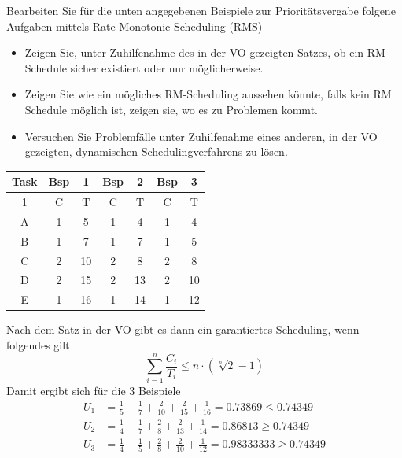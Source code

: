 \documentclass[12pt,a4paper,ngerman]{article}
\begin{document}
\begin{framed}
Bearbeiten Sie für die unten angegebenen Beispiele zur Prioritätsvergabe folgene Aufgaben mittels Rate-Monotonic Scheduling (RMS)
\begin{itemize}
\item Zeigen Sie, unter Zuhilfenahme des in der VO gezeigten Satzes, ob ein RM-Schedule sicher existiert oder nur möglicherweise.
\item Zeigen Sie wie ein mögliches RM-Scheduling aussehen könnte, falls kein RM Schedule möglich ist, zeigen sie, wo es zu Problemen kommt. 
\item Versuchen Sie Problemfälle unter Zuhilfenahme eines anderen, in der VO gezeigten, dynamischen Schedulingverfahrens zu lösen. 
\end{itemize}


\end{framed}
\begin{table}[h!]
  \begin{center}
    \begin{tabular}{c c c c c c c}
    \toprule
    Task &Bsp & 1 & Bsp & 2 & Bsp & 3  \\ \midrule
     1 & C & T & C & T & C & T  \\
     A & 1 & 5 & 1 & 4 & 1 & 4 \\
     B & 1 & 7 & 1 & 7 & 1 & 5 \\
     C & 2 & 10 & 2 & 8 & 2 & 8 \\
     D & 2 & 15 & 2 & 13 & 2 & 10 \\
     E & 1 & 16 & 1 & 14 & 1 & 12\\    
      \bottomrule
    \end{tabular}
  \end{center}
\end{table}
Nach dem Satz in der VO gibt es dann ein garantiertes Scheduling, wenn folgendes gilt
\begin{equation}
\sum_{i=1}^{n}{\frac{C_i}{T_i}} \leq n \cdot \left(\sqrt[n]{2}-1\right)
\end{equation}
Damit ergibt sich für die 3 Beispiele
\begin{align*}
U_1 &= \frac{1}{5} + \frac{1}{7} + \frac{ 2}{10} + \frac{2}{15} + \frac{1}{16} = 0.73869 \leq 0.74349 \\
U_2 &= \frac{1}{4} + \frac{1}{7} + \frac{2}{8} + \frac{2}{13} + \frac{1}{14} = 0.86813 \geq 0.74349\\
U_3 &= \frac{1}{4} + \frac{1}{5} + \frac{2}{8} + \frac{2}{10} + \frac{1}{12} = 0.98333333 \geq 0.74349
\end{align*}
\end{document}
